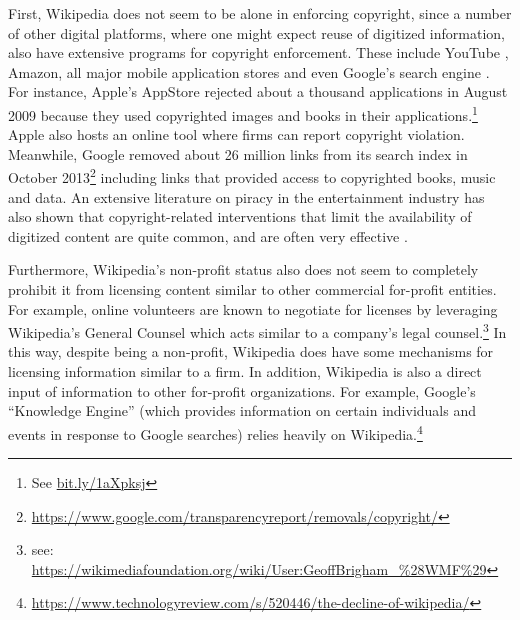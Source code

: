 \documentclass[11pt]{article}
\begin{document}
First, Wikipedia does not seem to be alone in enforcing copyright, since a number of other digital platforms, where one might expect reuse of digitized information, also have extensive programs for copyright enforcement. These include YouTube \citep{seidenberg_copyright_2009}, Amazon, all major mobile application stores and even Google's search engine \citep{dillon_scott_google_2011}. For instance, Apple's AppStore rejected about a thousand applications in August 2009 because they used copyrighted images and books in their applications.\footnote{See \url{bit.ly/1aXpksj}} Apple also hosts an online tool where firms can report copyright violation. Meanwhile, Google removed about 26 million links from its search index in October 2013\footnote{\url{https://www.google.com/transparencyreport/removals/copyright/}} including links that provided access to copyrighted books, music and data. An extensive literature on piracy \citep{bechtold_digital_2004} in the entertainment industry has also shown that copyright-related interventions that limit the availability of digitized content are quite common, and are often very effective \citep{danaher_converting_2010, danaher_gone_2013}. 

Furthermore, Wikipedia's non-profit status also does not seem to completely prohibit it from licensing content similar to other commercial for-profit entities. For example, online volunteers are known to negotiate for licenses by leveraging Wikipedia's General Counsel which acts similar to a company's legal counsel.\footnote{see: \url{https://wikimediafoundation.org/wiki/User:GeoffBrigham_\%28WMF\%29}} In this way, despite being a non-profit, Wikipedia does have some mechanisms for licensing information similar to a firm. In addition, Wikipedia is also a direct input of information to other for-profit organizations. For example, Google's ``Knowledge Engine'' (which provides information on certain individuals and events in response to Google searches) relies heavily on Wikipedia.\footnote{\url{https://www.technologyreview.com/s/520446/the-decline-of-wikipedia/}}
\end{document}
